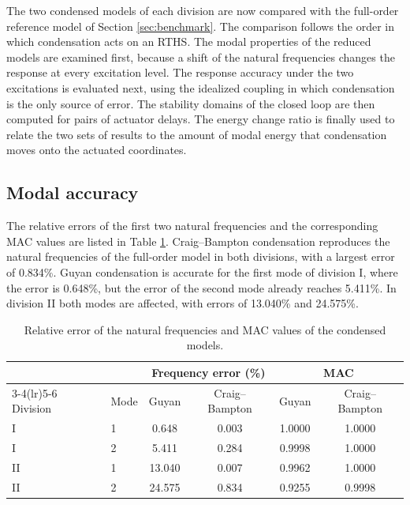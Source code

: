\documentclass[11pt,a4paper]{article}
\numberwithin{equation}{section}
\begin{document}
The two condensed models of each division are now compared with the full-order reference model of Section \ref{sec:benchmark}. The comparison follows the order in which condensation acts on an RTHS. The modal properties of the reduced models are examined first, because a shift of the natural frequencies changes the response at every excitation level. The response accuracy under the two excitations is evaluated next, using the idealized coupling in which condensation is the only source of error. The stability domains of the closed loop are then computed for pairs of actuator delays. The energy change ratio is finally used to relate the two sets of results to the amount of modal energy that condensation moves onto the actuated coordinates.

\subsection{Modal accuracy}
\label{sec:modal-accuracy}

The relative errors of the first two natural frequencies and the corresponding MAC values are listed in Table \ref{tab:modal}. Craig--Bampton condensation reproduces the natural frequencies of the full-order model in both divisions, with a largest error of 0.834\%. Guyan condensation is accurate for the first mode of division I, where the error is 0.648\%, but the error of the second mode already reaches 5.411\%. In division II both modes are affected, with errors of 13.040\% and 24.575\%.

\begin{table}[htbp]
	\centering
	\caption{Relative error of the natural frequencies and MAC values of the condensed models.}
	\label{tab:modal}
	\begin{tabular}{llcccc}
		\toprule
		& & \multicolumn{2}{c}{Frequency error (\%)} & \multicolumn{2}{c}{MAC}\\
		\cmidrule(lr){3-4}\cmidrule(lr){5-6}
		Division & Mode & Guyan & Craig--Bampton & Guyan & Craig--Bampton\\
		\midrule
		I  & 1 & 0.648  & 0.003 & 1.0000 & 1.0000\\
		I  & 2 & 5.411  & 0.284 & 0.9998 & 1.0000\\
		\midrule
		II & 1 & 13.040 & 0.007 & 0.9962 & 1.0000\\
		II & 2 & 24.575 & 0.834 & 0.9255 & 0.9998\\
		\bottomrule
	\end{tabular}
\end{table}
\end{document}

